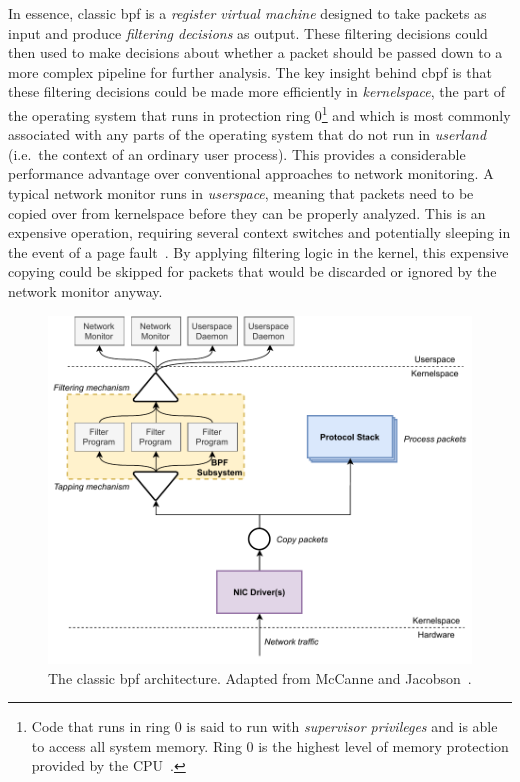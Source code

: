 In essence, classic \gls{bpf} is a \textit{register virtual machine} designed to take packets as
input and produce \textit{filtering decisions} as output. These filtering decisions could
then used to make decisions about whether a packet should be passed down to a more complex
pipeline for further analysis. The key insight behind \gls{cbpf} is that these filtering
decisions could be made more efficiently in \textit{kernelspace}, the part of the
operating system that runs in protection ring 0\footnote{Code that runs in ring 0 is said
to run with \textit{supervisor privileges} and is able to access all system memory. Ring
0 is the highest level of memory protection provided by the CPU~\cite{jaeger2008_os_security}.}
and which is most commonly associated with any parts of the operating system that do not
run in \textit{userland} (i.e.~the context of an ordinary user process). This provides
a considerable performance advantage over conventional approaches to network monitoring.
A typical network monitor runs in \textit{userspace}, meaning that packets need to be
copied over from kernelspace before they can be properly analyzed. This is an expensive
operation, requiring several context switches and potentially sleeping in the event of
a page fault~\cite{mccanne1993_bpf}.  By applying filtering logic in the kernel, this
expensive copying could be skipped for packets that would be discarded or ignored by the
network monitor anyway.

\begin{figure}[tbp]
  \centering
  \includegraphics[width=0.8\linewidth]{figs/background/classic-bpf.pdf}
  \caption[The classic BPF architecture]{The classic \gls{bpf} architecture. Adapted from McCanne and Jacobson~\cite{mccanne1993_bpf}.}%
  \label{fig:classic-bpf}
\end{figure}


